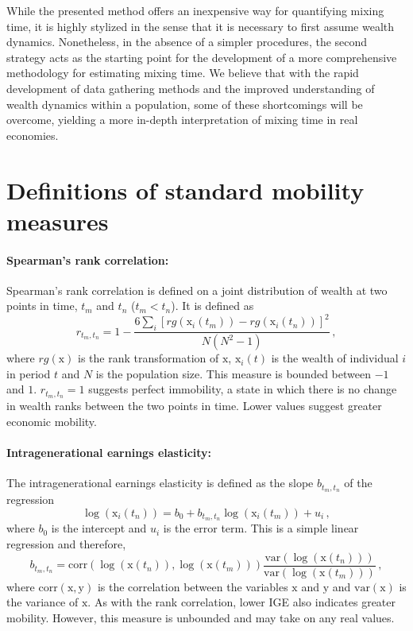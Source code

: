 \documentclass[11pt]{article}
\newcommand{\be}{\begin{equation}}
\newcommand{\ee}{\end{equation}}
\numberwithin{equation}{section}
\begin{document}
While the presented method offers an inexpensive way for quantifying mixing time, it is highly stylized in the sense that it is necessary to first assume wealth dynamics. Nonetheless, in the absence of a simpler procedures, the second strategy acts as the starting point for the development of a more comprehensive methodology for estimating mixing time. We believe that with the rapid development of data gathering methods and the improved understanding of wealth dynamics within a population, some of these shortcomings will be overcome, yielding a more in-depth interpretation of mixing time in real economies.

%

\clearpage

\appendix

\section{Definitions of standard mobility measures}\label{sec:standard-mobility-measures}

\paragraph{Spearman's rank correlation:} Spearman's rank correlation is defined on a joint distribution of wealth at two points in time, $t_m$ and $t_n$ ($t_m < t_n$). It is defined as
%
\be
    r_{t_m,t_n} = 1 - \frac{6\sum_i \left[rg\left(\mathrm{x}_i\left(t_m\right)\right) - rg\left(\mathrm{x}_i\left(t_n\right)\right)\right]^2}{N\left(N^2-1\right)}\,,
\ee
%
where $rg(\mathrm{x})$ is the rank transformation of $\mathrm{x}$, $\mathrm{x}_i(t)$ is the wealth of individual $i$ in period $t$ and $N$ is the population size. This measure is bounded between $-1$ and $1$. $r_{t_m,t_n} = 1$ suggests perfect immobility, a state in which there is no change in wealth ranks between the two points in time. Lower values suggest greater economic mobility.

\paragraph{Intragenerational earnings elasticity:} The intragenerational earnings elasticity is defined as the slope $b_{t_m,t_n}$ of the regression
%
\be
   \log\left(\mathrm{x}_i\left(t_n\right)\right) = b_0 + b_{t_m,t_n} \log\left(\mathrm{x}_i\left(t_m\right)\right) + u_i\,,
\ee
%
where $b_0$ is the intercept and $u_i$ is the error term. This is a simple linear regression and therefore,
%
\be
    b_{t_m,t_n} = \mathrm{corr}\left(\log\left(\mathrm{x}\left(t_n\right)\right),\log\left(\mathrm{x}\left(t_m\right)\right)\right) \frac{\mathrm{var}\left(\log\left(\mathrm{x}\left(t_n\right)\right)\right)}{\mathrm{var}\left(\log\left(\mathrm{x}\left(t_m\right)\right)\right)}\,,
    \label{eq:iee-estimation}
\ee
%
where $\mathrm{corr}(\mathrm{x},\mathrm{y})$ is the correlation between the variables $\mathrm{x}$ and $\mathrm{y}$ and $\mathrm{var}(\mathrm{x})$ is the variance of $\mathrm{x}$. As with the rank correlation, lower IGE also indicates greater mobility. However, this measure is unbounded and may take on any real values.
\end{document}
